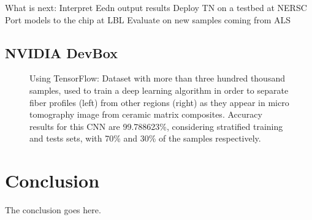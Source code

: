 \documentclass[conference]{IEEEtran}
\begin{document}
What is next:
Interpret Eedn output results
Deploy TN on a testbed at NERSC
Port models to the chip at LBL
Evaluate on new samples coming from ALS

\subsection{NVIDIA DevBox}



\begin{figure}[!t]
\centering
{}
\hfil
{}
\caption{Using TensorFlow: Dataset with more than three hundred thousand samples, used to train a deep
learning algorithm in order to separate fiber profiles (left) from other regions (right) as they
appear in micro tomography image from ceramic matrix composites. Accuracy results for this CNN are
99.788623\%, considering stratified training and tests sets, with 70\% and 30\% of the samples
respectively.}
\label{fig:pycbir}
\end{figure}



\section{Conclusion}
The conclusion goes here.
\end{document}
